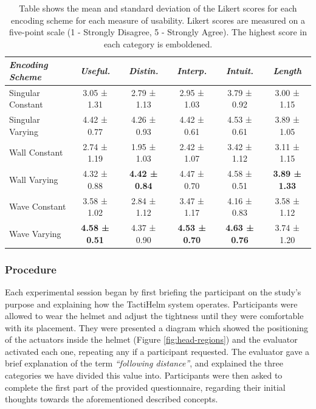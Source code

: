 \documentclass{mpaper}
\begin{document}
\begin{table}[h]
    \centering
    \begin{tabular}{l|c|c|c|c|c}
        \emph{Encoding Scheme} & \emph{Useful.} & \emph{Distin.} & \emph{Interp.} & \emph{Intuit.} & \emph{Length} \\ \hline
        Singular Constant & 3.05 ± 1.31 & 2.79 ± 1.13 & 2.95 ± 1.03 & 3.79 ± 0.92 & 3.00 ± 1.15 \\ 
        Singular Varying & 4.42 ± 0.77 & 4.26 ± 0.93 & 4.42 ± 0.61 & 4.53 ± 0.61 & 3.89 ± 1.05 \\ 
        Wall Constant & 2.74 ± 1.19 & 1.95 ± 1.03 & 2.42 ± 1.07 & 3.42 ± 1.12 & 3.11 ± 1.15 \\ 
        Wall Varying & 4.32 ± 0.88 & \textbf{4.42 ± 0.84} & 4.47 ± 0.70 & 4.58 ± 0.51 & \textbf{3.89 ± 1.33} \\
        Wave Constant & 3.58 ± 1.02 & 2.84 ± 1.12 & 3.47 ± 1.17 & 4.16 ± 0.83 & 3.58 ± 1.12 \\
        Wave Varying & \textbf{4.58 ± 0.51} & 4.37 ± 0.90 & \textbf{4.53 ± 0.70} & \textbf{4.63 ± 0.76} & 3.74 ± 1.20 \\
    \end{tabular}
    \caption{Table shows the mean and standard deviation of the Likert scores for each encoding scheme for each measure of usability. Likert scores are measured on a five-point scale (1 - Strongly Disagree, 5 - Strongly Agree). The highest score in each category is emboldened.}
    \label{tab:usability-scores}
\end{table}

\subsubsection{Procedure}
Each experimental session began by first briefing the participant on the study’s purpose and explaining how the TactiHelm system operates. Participants were allowed to wear the helmet and adjust the tightness until they were comfortable with its placement. They were presented a diagram which showed the positioning of the actuators inside the helmet (Figure \ref{fig:head-regions}) and the evaluator activated each one, repeating any if a participant requested. The evaluator gave a brief explanation of the term \textit{“following distance”}, and explained the three categories we have divided this value into. Participants were then asked to complete the first part of the provided questionnaire, regarding their initial thoughts towards the aforementioned described concepts.
\end{document}
